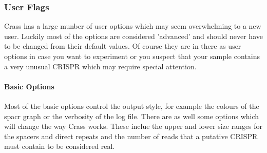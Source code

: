 \documentclass[11pt]{article} %
\begin{document}
\subsubsection{User Flags}
\label{sec:userflags}
Crass has a large munber of user options which may seem overwhelming to a new user.  Luckily most of the options are considered 'advanced' and should never have to be changed from their default values.  Of course they are in there as user options in case you want to experiment or you suspect that your sample contains a very unusual CRISPR which may require special attention. 
\paragraph{Basic Options}
Most of the basic options control the output style, for example the colours of the spacr graph or the verbosity of the log file.  There are as well some options which will change the way Crass works.  These inclue the upper and lower size ranges for the spacers and direct repeats and the number of reads that a putative CRISPR must contain to be considered real.
\end{document}
